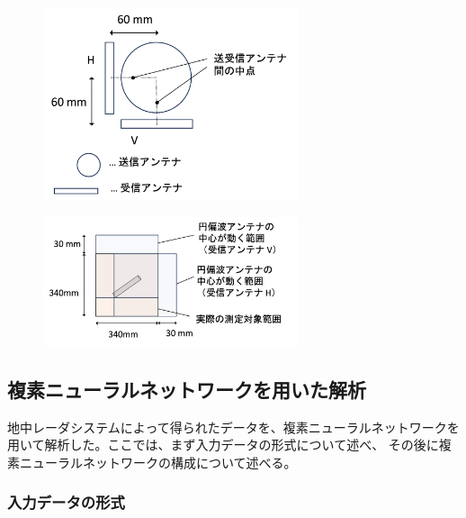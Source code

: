 \documentclass[11pt,a4paper,uplatex]{ujarticle}
\begin{document}
  \begin{figure}[tbp]
    \begin{minipage}[b]{0.395\textwidth}
      \centering
      \includegraphics[keepaspectratio, width=75mm]{Images/antenna_pos.png}
      \label{fig:center_offset}
    \end{minipage}
    \begin{minipage}[b]{0.595\textwidth}
      \centering
      \includegraphics[keepaspectratio, width=75mm]{Images/offset.png}
      \label{fig:actual_msr_range}
    \end{minipage}
  \end{figure}


  \subsection{複素ニューラルネットワークを用いた解析}\label{sec:analysis}
  地中レーダシステムによって得られたデータを、複素ニューラルネットワークを用いて解析した。ここでは、まず入力データの形式について述べ、
  その後に複素ニューラルネットワークの構成について述べる。
  \subsubsection{入力データの形式}
\end{document}
